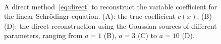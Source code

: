 \documentclass[12pt]{amsart}
\begin{document}
\begin{figure}
    \centering
    \\
    \caption{A direct method~\eqref{eq:direct} to reconstruct the variable coefficient for the linear Schr\"odingr equation. (A): the true coefficient $c(x)$; (B)-(D): the direct reconstruction using the Gaussian sources of different parameters,  ranging from $a=1$ (B), $a=3$ (C) to $a=10$ (D).}
    \label{fig:direct_method}
\end{figure}
\end{document}
